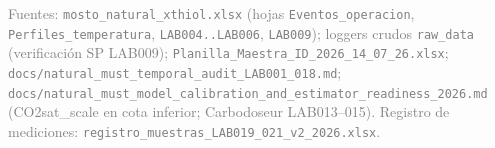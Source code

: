 \documentclass[10pt,landscape]{article}
\begin{document}
\vspace{4pt}
{\sloppy
\noindent\begin{minipage}{\linewidth}
\textcolor{gray}{\footnotesize Fuentes: \texttt{mosto\_natural\_xthiol.xlsx} (hojas \texttt{Eventos\_operacion}, \texttt{Perfiles\_temperatura}, \texttt{LAB004..LAB006}, \texttt{LAB009}); loggers crudos \texttt{raw\_data} (verificación SP LAB009); \texttt{Planilla\_Maestra\_ID\_2026\_14\_07\_26.xlsx}; \texttt{docs/natural\_must\_temporal\_audit\_LAB001\_018.md}; \texttt{docs/natural\_must\_model\_calibration\_and\_estimator\_readiness\_2026.md} (CO2sat\_scale en cota inferior; Carbodoseur LAB013--015). Registro de mediciones: \texttt{registro\_muestras\_LAB019\_021\_v2\_2026.xlsx}.}
\end{minipage}\par}
\end{document}
